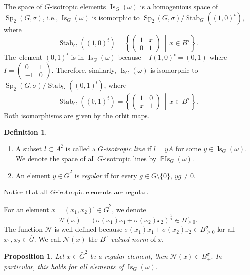 \documentclass[a4paper,oneside,11pt]{amsart}
\DeclareMathOperator{\Sp}{Sp}
\DeclareMathOperator{\Stab}{Stab}
\DeclareMathOperator{\Is}{Is}
\DeclareMathOperator{\PIs}{\mathbb{P}Is}
\newcommand{\midwd}{\,\middle\vert\,}
\theoremstyle{plain}
\newtheorem{prop}[teo]{Proposition}
\theoremstyle{definition}
\newtheorem{df}[teo]{Definition}
\theoremstyle{remark}
\newcommand{\bs}{\setminus}
\newcommand{\defin}{\emph}
\begin{document}
The space of $G$-isotropic elements $\Is_G(\omega)$ is a homogenious space of $\Sp_2(G,\sigma)$, i.e., $\Is_G(\omega)$ is isomorphic to $\Sp_2(G,\sigma)/\Stab_{G}((1,0)^t)$, where 
$$\Stab_{G}((1,0)^t)=\left\{\begin{pmatrix}
1 & x \\
0 & 1
\end{pmatrix} \midwd x\in B^\sigma \right\}.$$ The~element $(0,1)^t$ is in $\Is_G(\omega)$ because $-I(1,0)^t=(0,1)$ where
$I=\begin{pmatrix}
0 & 1 \\
-1 & 0
\end{pmatrix}$. Therefore, similarly, $\Is_G(\omega)$ is isomorphic to $\Sp_2(G,\sigma)/\Stab_{G}((0,1)^t)$, where 
$$\Stab_{G}((0,1)^t)=\left\{\begin{pmatrix}
1 & 0 \\
x & 1
\end{pmatrix} \midwd x\in B^\sigma \right\}.$$
Both isomorphisms are given by the orbit maps.

\begin{df}\begin{enumerate}
    \item A subset $l\subset A^2$ is called a \defin{$G$-isotropic line} if $l=yA$ for some $y\in\Is_G(\omega)$. We denote the space of all $G$-isotropic lines by $\PIs_G(\omega)$.
    \item An element $y\in \bar G^2$ is \defin{regular} if for every $g\in\bar G\bs\{0\}$, $yg\neq 0$.
\end{enumerate}
\end{df}

\noindent Notice that all $G$-isotropic elements are regular.

For an element $x=(x_1,x_2)^t\in\bar G^2$, we denote 
$$\mathcal N(x)=(\sigma(x_1)x_1+\sigma(x_2)x_2)^{\frac{1}{2}}\in B^\sigma_{\geq 0}.$$
The function $\mathcal N$ is well-defined because $\sigma(x_1)x_1+\sigma(x_2)x_2\in B^\sigma_{\geq 0}$ for all $x_1,x_2\in \bar G$. We call $\mathcal N(x)$ the \defin{$B^\sigma$-valued norm} of $x$. 

\begin{prop}\label{RegEl-h}
Let $x\in \bar G^2$ be a regular element, then $\mathcal N(x)\in B^{\sigma}_+.$ In particular, this holds for all elements of $\Is_G(\omega)$.
\end{prop}
\end{document}
